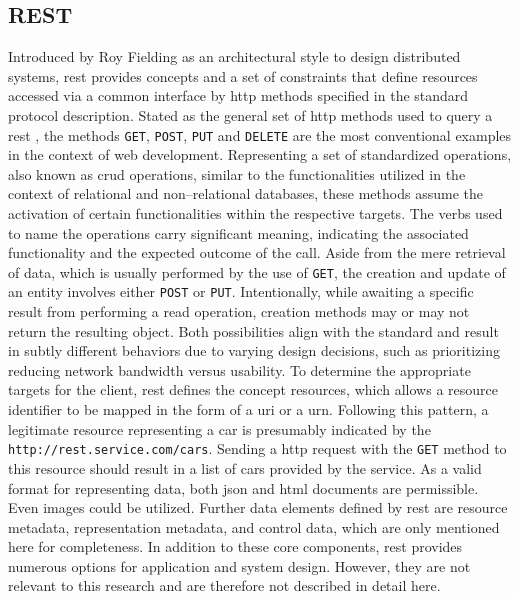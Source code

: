 \subsection{REST}
\label{ch:Fundamentals:sec:Data Exchange:ssec:REST}

Introduced by Roy Fielding as an architectural style \cite{patni_pro_2017} to design distributed systems, \acrfull{rest} provides concepts and a set of constraints that define resources accessed via a common interface by \acrshort{http} methods specified in the standard protocol description.
Stated as the general set of \acrshort{http} methods used to query a \acrshort{rest} , the methods \verb|GET|, \verb|POST|, \verb|PUT| and \verb|DELETE| are the most conventional examples in the context of web development.
Representing a set of standardized operations, also known as \acrshort{crud} operations, similar to the functionalities utilized in the context of relational and non--relational databases, these methods assume the activation of certain functionalities within the respective targets.
The verbs used to name the operations carry significant meaning, indicating the associated functionality and the expected outcome of the call.
Aside from the mere retrieval of data, which is usually performed by the use of \verb|GET|, the creation and update of an entity involves either \verb|POST| or \verb|PUT|.
Intentionally, while awaiting a specific result from performing a read operation, creation methods may or may not return the resulting object. Both possibilities align with the standard and result in subtly different behaviors due to varying design decisions, such as prioritizing reducing network bandwidth versus usability.
To determine the appropriate targets for the client, \acrshort{rest} defines the concept resources, which allows a resource identifier to be mapped in the form of a \acrshort{uri} or a \acrshort{urn}. Following this pattern, a legitimate resource representing a car is presumably indicated by the  \verb|http://rest.service.com/cars|.
Sending a \acrshort{http} request with the \verb|GET| method to this resource should result in a list of cars provided by the service. As a valid format for representing data, both \acrshort{json} and \acrshort{html} documents are permissible. Even images could be utilized.
Further data elements defined by \acrshort{rest} are resource metadata, representation metadata, and control data, which are only mentioned here for completeness.
In addition to these core components, \acrshort{rest} provides numerous options for application and system design. However, they are not relevant to this research and are therefore not described in detail here.

